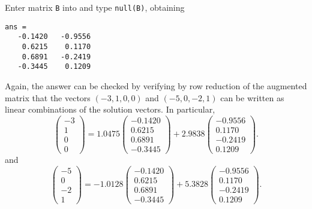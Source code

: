 \documentclass{ximera}
\begin{document}
\begin{computerExercise}
\begin{solution}
Enter matrix {\tt B} into \Matlab and type {\tt null(B)}, obtaining
\begin{verbatim}
ans =
   -0.1420   -0.9556
    0.6215    0.1170
    0.6891   -0.2419
   -0.3445    0.1209    
\end{verbatim}
Again, the \Matlab answer can be checked by verifying by row reduction
of the augmented matrix that the vectors $(-3,1,0,0)$ and $(-5,0,-2,1)$
can be written as linear combinations of the \Matlab solution vectors.
In particular,
\[
\left(\begin{array}{r} -3 \\ 1 \\ 0 \\ 0 \end{array}\right) =
1.0475\left(\begin{array}{r}  -0.1420 \\ 0.6215 \\ 0.6891 \\ -0.3445 \end{array}\right) +
2.9838\left(\begin{array}{r} -0.9556 \\ 0.1170 \\ -0.2419 \\ 0.1209 \end{array}\right).
\]
and
\[
\left(\begin{array}{r} -5 \\ 0 \\ -2 \\ 1 \end{array}\right) =
-1.0128\left(\begin{array}{r}  -0.1420 \\ 0.6215 \\ 0.6891 \\ -0.3445 \end{array}\right) +
5.3828\left(\begin{array}{r} -0.9556 \\ 0.1170 \\ -0.2419 \\ 0.1209 \end{array}\right).
\]

\end{solution}
\end{computerExercise}
\end{document}
